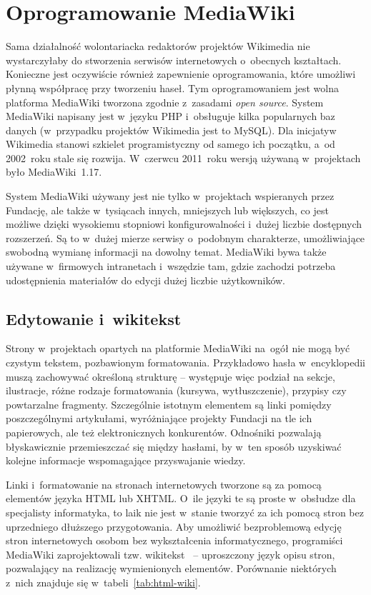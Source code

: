 \section{Oprogramowanie MediaWiki}
\label{sec:mw}
Sama działalność wolontariacka redaktorów projektów Wikimedia nie wystarczyłaby do stworzenia serwisów internetowych o~obecnych kształtach. Konieczne jest oczywiście również zapewnienie oprogramowania, które umożliwi płynną współpracę przy tworzeniu haseł. Tym oprogramowaniem jest wolna platforma MediaWiki tworzona zgodnie z~zasadami \emph{open source}. System MediaWiki napisany jest w~języku PHP i~obsługuje kilka popularnych baz danych (w~przypadku projektów Wikimedia jest to MySQL). Dla inicjatyw Wikimedia stanowi szkielet programistyczny od samego ich początku, a~od 2002~roku stale się rozwija. W~czerwcu 2011~roku wersją używaną w~projektach było MediaWiki~1.17.

System MediaWiki używany jest nie tylko w~projektach wspieranych przez Fundację, ale także w~tysiącach innych, mniejszych lub większych, co jest możliwe dzięki wysokiemu stopniowi konfigurowalności i~dużej liczbie dostępnych rozszerzeń. Są to w~dużej mierze serwisy o~podobnym charakterze, umożliwiające swobodną wymianę informacji na dowolny temat. MediaWiki bywa także używane w~firmowych intranetach i~wszędzie tam, gdzie zachodzi potrzeba udostępnienia materiałów do edycji dużej liczbie użytkowników.

\subsection{Edytowanie i~wikitekst}
Strony w~projektach opartych na platformie MediaWiki na~ogół nie mogą być czystym tekstem, pozbawionym formatowania. Przykładowo hasła w~encyklopedii muszą zachowywać określoną strukturę -- występuje więc podział na sekcje, ilustracje, różne rodzaje formatowania (kursywa, wytłuszczenie), przypisy czy powtarzalne fragmenty. Szczególnie istotnym elementem są linki pomiędzy poszczególnymi artykułami, wyróżniające projekty Fundacji na tle ich papierowych, ale też elektronicznych konkurentów. Odnośniki pozwalają błyskawicznie przemieszczać się między hasłami, by w~ten sposób uzyskiwać kolejne informacje wspomagające przyswajanie wiedzy.

Linki i~formatowanie na stronach internetowych tworzone są za pomocą elementów języka HTML lub XHTML. O~ile języki te są proste w~obsłudze dla specjalisty informatyka, to laik nie jest w~stanie tworzyć za ich pomocą stron bez uprzedniego dłuższego przygotowania. Aby umożliwić bezproblemową edycję stron internetowych osobom bez wykształcenia informatycznego, programiści MediaWiki zaprojektowali tzw. wikitekst~\cite{mw:help} -- uproszczony język opisu stron, pozwalający na realizację wymienionych elementów. Porównanie niektórych z~nich znajduje się w~tabeli~\ref{tab:html-wiki}.

